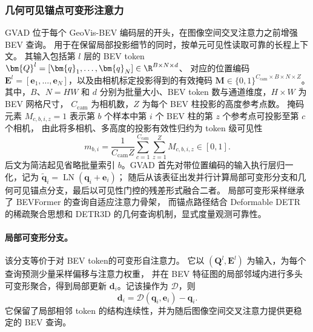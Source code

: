 \subsubsection{几何可见锚点可变形注意力}\label{sec:gvad}
GVAD 位于每个 GeoVis-BEV 编码层的开头，在图像空间交叉注意力之前增强 BEV 查询。
用于在保留局部投影细节的同时，按单元可见性读取可靠的长程上下文。
其输入包括第 $l$ 层的 BEV token $\bm{Q}^{l}=[\bm{q}_1,\ldots,\bm{q}_{N}]\in\R^{B\times N\times d}$、
对应的位置编码 $\bm{E}^{l}=[\bm{e}_1,\ldots,\bm{e}_{N}]$，以及由相机标定投影得到的有效掩码
$\bm{M}\in\{0,1\}^{C_{\mathrm{cam}}\times B\times N\times Z}$。
其中，$B$、$N=HW$ 和 $d$ 分别为批量大小、BEV token 数与通道维度，$H\times W$ 为 BEV 网格尺寸，
$C_{\mathrm{cam}}$ 为相机数，$Z$ 为每个 BEV 柱投影的高度参考点数。
掩码元素 $M_{c,b,i,z}=1$ 表示第 $b$ 个样本中第 $i$ 个 BEV 柱的第 $z$ 个参考点可投影至第 $c$ 个相机，
由此将多相机、多高度的投影有效性归约为 token 级可见性
\begin{equation}
m_{b,i}=\frac{1}{C_{\mathrm{cam}}Z}\sum_{c=1}^{C_{\mathrm{cam}}}\sum_{z=1}^{Z}M_{c,b,i,z}\in[0,1].
\end{equation}
后文为简洁起见省略批量索引 $b$。GVAD 首先对带位置编码的输入执行层归一化，记为
$\tilde{\bm{q}}_i=\operatorname{LN}(\bm{q}_i+\bm{e}_i)$；
随后从该表征出发并行计算局部可变形分支和几何可见锚点分支，最后以可见性门控的残差形式融合二者。
局部可变形采样继承了 BEVFormer 的查询自适应注意力骨架\cite{li2022bevformer}，
而锚点路径结合 Deformable DETR\cite{zhu2021deformable} 的稀疏聚合思想和
 DETR3D\cite{wang2022detr3d} 的几何查询机制，显式度量观测可靠性。

\paragraph{局部可变形分支。}
该分支等价于对 BEV token的可变形自注意力。
它以 $(\bm{Q}^{l},\bm{E}^{l})$ 为输入，为每个查询预测少量采样偏移与注意力权重，
并在 BEV 特征图的局部邻域内进行多头可变形聚合，得到局部更新 $\bm{d}_i$。记该操作为 $\mathcal{D}$，则
\begin{equation}
\bm{d}_i=\mathcal{D}(\bm{q}_i,\bm{e}_i)-\bm{q}_i.
\end{equation}
它保留了局部相邻 token 的结构连续性，并为随后图像空间交叉注意力提供更稳定的 BEV 查询。

